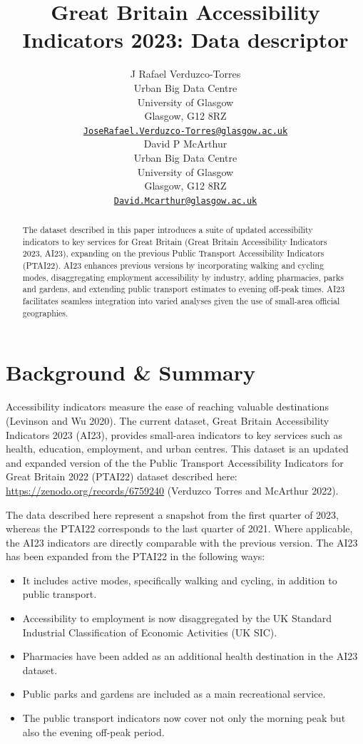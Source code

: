 \documentclass{article}
\title{Great Britain Accessibility Indicators 2023: Data descriptor}
\author{
    J Rafael Verduzco-Torres
   \\
    Urban Big Data Centre \\
    University of Glasgow \\
  Glasgow, G12 8RZ \\
  \texttt{\href{mailto:JoseRafael.Verduzco-Torres@glasgow.ac.uk}{\nolinkurl{JoseRafael.Verduzco-Torres@glasgow.ac.uk}}} \\
   \And
    David P McArthur
   \\
    Urban Big Data Centre \\
    University of Glasgow \\
  Glasgow, G12 8RZ \\
  \texttt{\href{mailto:David.Mcarthur@glasgow.ac.uk}{\nolinkurl{David.Mcarthur@glasgow.ac.uk}}} \\
  }
\providecommand{\tightlist}{%
  \setlength{\itemsep}{0pt}\setlength{\parskip}{0pt}}
\begin{document}
\maketitle


\begin{abstract}
The dataset described in this paper introduces a suite of updated
accessibility indicators to key services for Great Britain (Great
Britain Accessibility Indicators 2023, AI23), expanding on the previous
Public Transport Accessibility Indicators (PTAI22). AI23 enhances
previous versions by incorporating walking and cycling modes,
disaggregating employment accessibility by industry, adding pharmacies,
parks and gardens, and extending public transport estimates to evening
off-peak times. AI23 facilitates seamless integration into varied
analyses given the use of small-area official geographies.
\end{abstract}


\hypertarget{background-summary}{%
\section{Background \& Summary}\label{background-summary}}

Accessibility indicators measure the ease of reaching valuable
destinations (Levinson and Wu 2020). The current dataset, Great Britain
Accessibility Indicators 2023 (AI23), provides small-area indicators to
key services such as health, education, employment, and urban centres.
This dataset is an updated and expanded version of the the Public
Transport Accessibility Indicators for Great Britain 2022 (PTAI22)
dataset described here: \url{https://zenodo.org/records/6759240}
(Verduzco Torres and McArthur 2022).

The data described here represent a snapshot from the first quarter of
2023, whereas the PTAI22 corresponds to the last quarter of 2021. Where
applicable, the AI23 indicators are directly comparable with the
previous version. The AI23 has been expanded from the PTAI22 in the
following ways:

\begin{itemize}
\tightlist
\item
  It includes active modes, specifically walking and cycling, in
  addition to public transport.
\item
  Accessibility to employment is now disaggregated by the UK Standard
  Industrial Classification of Economic Activities (UK SIC).
\item
  Pharmacies have been added as an additional health destination in the
  AI23 dataset.
\item
  Public parks and gardens are included as a main recreational service.
\item
  The public transport indicators now cover not only the morning peak
  but also the evening off-peak period.
\end{itemize}
\end{document}
